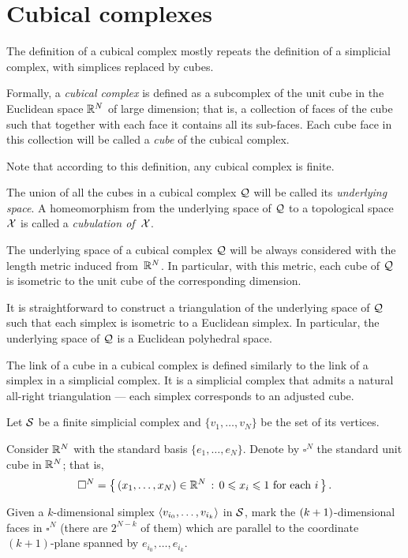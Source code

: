 \section{Cubical complexes}

The definition of a cubical complex
mostly repeats the definition of a simplicial complex, 
with simplices replaced by cubes.

Formally, a \emph{cubical complex} is defined as a subcomplex 
of the unit cube in the Euclidean space $\mathbb{R}^N$ of large dimension;
that is, a collection of faces of the cube
such that together with each face it contains all its sub-faces.
Each cube face in this collection 
will be called a \emph{cube} of the cubical complex.

Note that according to this definition, 
any cubical complex is finite.

The union of all the cubes in a cubical complex $\mathcal{Q}$ will be called its \emph{underlying space}.
A homeomorphism from the underlying space of $\mathcal{Q}$ to a topological space $\mathcal{X}$ is called a \emph{cubulation of}~$\mathcal{X}$.

The underlying space of a cubical complex $\mathcal{Q}$ will be always considered with the length metric
induced from~$\mathbb{R}^N$.
In particular, with this metric, 
each cube of $\mathcal{Q}$ is isometric to the unit cube of the corresponding dimension.

It is straightforward to construct a triangulation 
of the underlying space of $\mathcal{Q}$ 
such that each simplex is isometric to a Euclidean simplex.
In particular, the underlying space of $\mathcal{Q}$ is a Euclidean polyhedral space.

The link of a cube in a cubical complex is defined similarly to the link of a simplex in a simplicial complex.
It is a simplicial complex that admits a natural all-right triangulation --- each simplex corresponds to an adjusted cube.

Let $\mathcal{S}$ be a finite simplicial complex and $\{v_1,\dots,v_N\}$ be the set of its vertices.

Consider $\mathbb{R}^N$ with the standard basis $\{e_1,\dots,e_N\}$.
Denote by $\square^N$ the standard unit cube in $\mathbb{R}^N$;
that is, 
\[\square^N=\left\{\,{(x_1,\dots,x_N)\in \mathbb{R}^N}\,:\,{0\leqslant x_i\leqslant 1\ \text{for each}\ i}\,\right\}.\]

Given a $k$-dimensional simplex $\langle v_{i_0},\dots,v_{i_k}\rangle$ in $\mathcal{S}$, 
mark the $(k\z+1)$-dimensional faces in $\square^N$ (there are  $2^{N-k}$ of them)
which are parallel to the coordinate $(k+1)$-plane 
spanned by $e_{i_0},\dots,e_{i_k}$.


